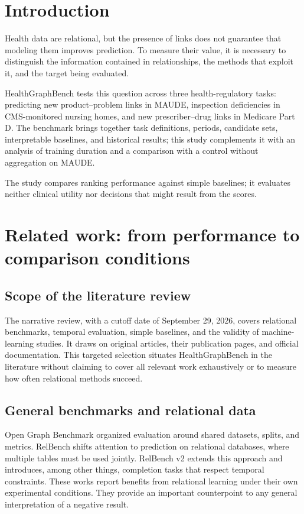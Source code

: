 \section{Introduction}

Health data are relational, but the presence of links does not guarantee that modeling them improves prediction. To measure their value, it is necessary to distinguish the information contained in relationships, the methods that exploit it, and the target being evaluated.

HealthGraphBench tests this question across three health-regulatory tasks: predicting new product--problem links in MAUDE, inspection deficiencies in CMS-monitored nursing homes, and new prescriber--drug links in Medicare Part D. The benchmark brings together task definitions, periods, candidate sets, interpretable baselines, and historical results; this study complements it with an analysis of training duration and a comparison with a control without aggregation on MAUDE.

The study compares ranking performance against simple baselines; it evaluates neither clinical utility nor decisions that might result from the scores.

\section{Related work: from performance to comparison conditions}

\subsection{Scope of the literature review}

The narrative review, with a cutoff date of September 29, 2026, covers relational benchmarks, temporal evaluation, simple baselines, and the validity of machine-learning studies. It draws on original articles, their publication pages, and official documentation. This targeted selection situates HealthGraphBench in the literature without claiming to cover all relevant work exhaustively or to measure how often relational methods succeed.

\subsection{General benchmarks and relational data}

Open Graph Benchmark organized evaluation around shared datasets, splits, and metrics\cite{hu2020ogb}. RelBench shifts attention to prediction on relational databases, where multiple tables must be used jointly\cite{robinson2024relbench}. RelBench v2 extends this approach and introduces, among other things, completion tasks that respect temporal constraints\cite{gu2026relbench}. These works report benefits from relational learning under their own experimental conditions. They provide an important counterpoint to any general interpretation of a negative result.

